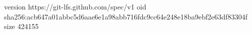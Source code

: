 version https://git-lfs.github.com/spec/v1
oid sha256:acb647a01abbc5d6aae6e1a98abb716fdc9cc64e248e18ba9ebf2e63df83304f
size 424155
